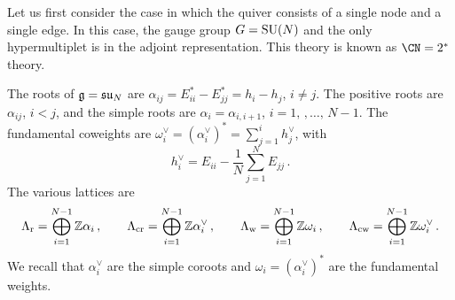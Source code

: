 Let us first consider the case in which the quiver consists of a
single node and a single edge.  In this case, the gauge group
$G = \mathrm{SU}(N)$ and the only hypermultiplet is in the adjoint
representation.  This theory is known as $\CN = 2^*$ theory.

The roots of $\mathfrak{g} = \mathfrak{su}_N$ are
$\alpha_{ij} = E_{ii}^* - E_{jj}^* = h_i - h_j$, $i \neq j$.  The
positive roots are $\alpha_{ij}$, $i < j$, and the simple roots are
$\alpha_i = \alpha_{i,i+1}$, $i = 1, \,, \dotsc,\, N-1$.  The
fundamental coweights are
$\omega^\vee_i = (\alpha_i^\vee)^* = \sum_{j=1}^i h^\vee_j$, with
\begin{equation}
  h^\vee_i = E_{ii} - \frac{1}{N} \sum_{j=1}^N E_{jj} \,.
\end{equation}
The various lattices are
\begin{equation}
  \Lambda_{\mathrm{r}} = \bigoplus_{i=1}^{N-1} \mathbb{Z} \alpha_i \,,
  \qquad
  \Lambda_{\mathrm{cr}} = \bigoplus_{i=1}^{N-1} \mathbb{Z} \alpha^\vee_i \,,
  \qquad
  \Lambda_{\mathrm{w}} = \bigoplus_{i=1}^{N-1} \mathbb{Z} \omega_i \,,
  \qquad
  \Lambda_{\mathrm{cw}} = \bigoplus_{i=1}^{N-1} \mathbb{Z} \omega^\vee_i \,.
\end{equation}
We recall that $\alpha^\vee_i$ are the simple coroots and
$\omega_i = (\alpha^\vee_i)^*$ are the fundamental weights.





